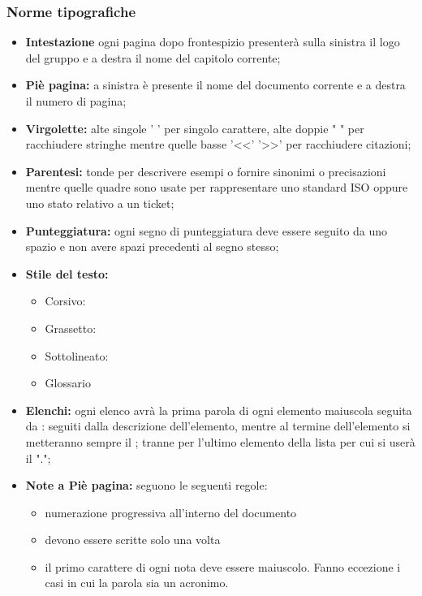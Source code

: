 \documentclass[NormeDiProgetto.tex]{subfiles}
\begin{document}
	\subsubsection{Norme tipografiche}
		\begin{itemize}
			\item \textbf{Intestazione} ogni pagina dopo frontespizio presenterà sulla sinistra il logo del gruppo e a destra il nome del capitolo corrente;
			
			\item \textbf{Piè pagina:} a sinistra è presente il nome del documento corrente e a destra il numero di pagina; 
			
			\item \textbf{Virgolette:} alte singole ' ' per singolo carattere, alte doppie " " per racchiudere stringhe mentre quelle basse '<<' '>>' per racchiudere citazioni;
			 
			\item \textbf{Parentesi:} tonde per descrivere esempi o fornire sinonimi o precisazioni mentre quelle quadre sono usate per rappresentare uno standard ISO oppure uno stato relativo a un ticket;
			
			\item \textbf{Punteggiatura:} ogni segno di punteggiatura deve essere seguito da uno spazio e non avere spazi precedenti al segno stesso;

			\item \textbf{Stile del testo:} 
			\begin{itemize}
				\item Corsivo: %
				\item Grassetto:
				\item Sottolineato:
				\item Glossario %
			\end{itemize}
		
			\item \textbf{Elenchi:} ogni elenco avrà la prima parola di ogni elemento maiuscola seguita da : seguiti dalla descrizione dell'elemento, mentre al termine dell'elemento si metteranno sempre il ; tranne per l'ultimo elemento della lista per cui si userà il ".";
			 
			\item \textbf{Note a Piè pagina:} seguono le seguenti regole: 
			\begin{itemize}
				\item numerazione progressiva all'interno del documento
				\item devono essere scritte solo una volta
				\item il primo carattere di ogni nota deve essere maiuscolo. Fanno eccezione i casi in cui la parola sia un acronimo.
			\end{itemize}
			 

\end{itemize}
\end{document}
